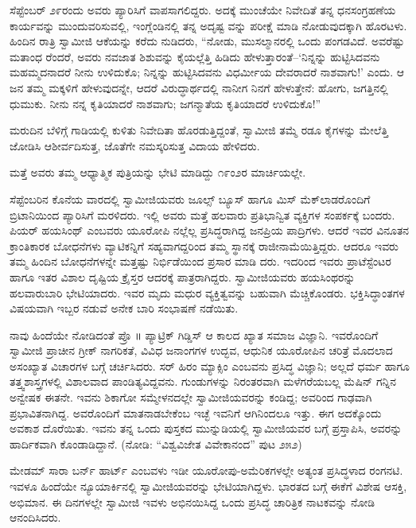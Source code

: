 ಸೆಪ್ಟೆಂಬರ್ ೨೯ರಂದು ಅವರು ಪ್ಯಾರಿಸಿಗೆ ವಾಪಸಾಗಲಿದ್ದರು. ಅದಕ್ಕೆ ಮುಂಚೆಯೇ ನಿವೇದಿತೆ ತನ್ನ ಧನಸಂಗ್ರಹಣೆಯ ಕಾರ್ಯವನ್ನು ಮುಂದುವರಿಸುವಲ್ಲಿ, ಇಂಗ್ಲೆಂಡಿನಲ್ಲಿ ತನ್ನ ಅದೃಷ್ಟ ವನ್ನು ಪರೀಕ್ಷೆ ಮಾಡಿ ನೋಡುವುದಕ್ಕಾಗಿ ಹೊರಟಳು. ಹಿಂದಿನ ರಾತ್ರಿ ಸ್ವಾಮೀಜಿ ಆಕೆಯನ್ನು ಕರೆದು ನುಡಿದರು, “ನೋಡು, ಮುಸಲ್ಮಾನರಲ್ಲಿ ಒಂದು ಪಂಗಡವಿದೆ. ಅವರೆಷ್ಟು ಮತಾಂಧ ರೆಂದರೆ, ಅವರು ನವಜಾತ ಶಿಶುವನ್ನು ಕೈಯಲ್ಲೆತ್ತಿ ಹಿಡಿದು ಹೇಳುತ್ತಾರಂತೆ–‘ನಿನ್ನನ್ನು ಹುಟ್ಟಿಸಿದವನು ಮಹಮ್ಮದನಾದರೆ ನೀನು ಉಳಿದುಕೊ; ನಿನ್ನನ್ನು ಹುಟ್ಟಿಸಿದವನು ವಿಧರ್ಮೀಯ ದೇವರಾದರೆ ನಾಶವಾಗು!’ ಎಂದು. ಆ ಜನ ತಮ್ಮ ಮಕ್ಕಳಿಗೆ ಹೇಳುವುದನ್ನೇ, ಆದರೆ ವಿರುದ್ಧಾರ್ಥದಲ್ಲಿ ನಾನೀಗ ನಿನಗೆ ಹೇಳುತ್ತೇನೆ: ಹೋಗು, ಜಗತ್ತಿನಲ್ಲಿ ಧುಮುಕು. ನೀನು ನನ್ನ ಕೃತಿಯಾದರೆ ನಾಶವಾಗು; ಜಗನ್ಮಾತೆಯ ಕೃತಿಯಾದರೆ ಉಳಿದುಕೊ!”

ಮರುದಿನ ಬೆಳಿಗ್ಗೆ ಗಾಡಿಯಲ್ಲಿ ಕುಳಿತು ನಿವೇದಿತಾ ಹೊರಡುತ್ತಿದ್ದಂತೆ, ಸ್ವಾಮೀಜಿ ತಮ್ಮೆ ರಡೂ ಕೈಗಳನ್ನು ಮೇಲೆತ್ತಿ ಜೋಡಿಸಿ ಆಶೀರ್ವದಿಸುತ್ತ, ಜೊತೆಗೇ ನಮಸ್ಕರಿಸುತ್ತ ವಿದಾಯ ಹೇಳಿದರು.

ಮತ್ತೆ ಅವರು ತಮ್ಮ ಆಧ್ಯಾತ್ಮಿಕ ಪುತ್ರಿಯನ್ನು ಭೇಟಿ ಮಾಡಿದ್ದು ೧೯ಂ೨ರ ಮಾರ್ಚಿಯಲ್ಲೇ.

ಸೆಪ್ಟೆಂಬರಿನ ಕೊನೆಯ ವಾರದಲ್ಲಿ ಸ್ವಾಮೀಜಿಯವರು ಜೂಲ್ಸ್ ಬ್ಯೂಸ್ ಹಾಗೂ ಮಿಸ್ ಮೆಕ್​ಲಾಡರೊಂದಿಗೆ ಬ್ರಿಟಾನಿಯಿಂದ ಪ್ಯಾರಿಸಿಗೆ ಮರಳಿದರು. ಇಲ್ಲಿ ಅವರು ಮತ್ತೆ ಹಲವಾರು ಪ್ರತಿಭಾನ್ವಿತ ವ್ಯಕ್ತಿಗಳ ಸಂಪರ್ಕಕ್ಕೆ ಬಂದರು. ಪಿಯರ್ ಹಯಸಿಂಥ್ ಎಂಬವರು ಯೂರೋಪಿ ನಲ್ಲೆಲ್ಲ ಪ್ರಸಿದ್ಧರಾಗಿದ್ದ ಜನಪ್ರಿಯ ಪಾದ್ರಿಗಳು. ಆದರೆ ಇವರ ವಿನೂತನ ಕ್ರಾಂತಿಕಾರಕ ಬೋಧನೆಗಳು ವ್ಯಾಟಿಕನ್ನಿಗೆ ಸಹ್ಯವಾಗದ್ದರಿಂದ ತಮ್ಮ ಸ್ಥಾನಕ್ಕೆ ರಾಜೀನಾಮೆಯಿತ್ತಿದ್ದರು. ಆದರೂ ಇವರು ತಮ್ಮ ಹಿಂದಿನ ಬೋಧನೆಗಳನ್ನೇ ಮತ್ತಷ್ಟು ನಿರ್ಭಿಡೆಯಿಂದ ಪ್ರಸಾರ ಮಾಡಿ ದರು. ಇದರಿಂದ ಇವರು ಪ್ರಾಟೆಸ್ಟೆಂಟರ ಹಾಗೂ ಇತರ ವಿಶಾಲ ದೃಷ್ಟಿಯ ಕ್ರೈಸ್ತರ ಆದರಕ್ಕೆ ಪಾತ್ರರಾಗಿದ್ದರು. ಸ್ವಾಮೀಜಿಯವರು ಹಯಸಿಂಥರನ್ನು ಹಲವಾರುಬಾರಿ ಭೇಟಿಯಾದರು. ಇವರ ಮೃದು ಮಧುರ ವ್ಯಕ್ತಿತ್ವವನ್ನು ಬಹುವಾಗಿ ಮೆಚ್ಚಿಕೊಂಡರು. ಭಕ್ತಿಸಿದ್ಧಾಂತಗಳ ವಿಷಯವಾಗಿ ಇಬ್ಬರ ನಡುವೆ ಅನೇಕ ಬಾರಿ ಸಂಭಾಷಣೆ ನಡೆಯಿತು.

ನಾವು ಹಿಂದೆಯೇ ನೋಡಿದಂತೆ ಪ್ರೊ ॥ ಪ್ಯಾಟ್ರಿಕ್ ಗಿಡ್ಡಿಸ್ ಆ ಕಾಲದ ಖ್ಯಾತ ಸಮಾಜ ವಿಜ್ಞಾನಿ. ಇವರೊಂದಿಗೆ ಸ್ವಾಮೀಜಿ ಪ್ರಾಚೀನ ಗ್ರೀಕ್ ನಾಗರಿಕತೆ, ವಿವಿಧ ಜನಾಂಗಗಳ ಉದ್ಭವ, ಆಧುನಿಕ ಯೂರೋಪಿನ ಚರಿತ್ರೆ ಮೊದಲಾದ ಅಸಂಖ್ಯಾತ ವಿಚಾರಗಳ ಬಗ್ಗೆ ಚರ್ಚಿಸಿದರು. ಸರ್ ಹಿರಂ ಮ್ಯಾಕ್ಸಿಂ ಎಂಬವನು ಪ್ರಸಿದ್ಧ ವಿಜ್ಞಾನಿ; ಅಲ್ಲದೆ ಧರ್ಮ ಹಾಗೂ ತತ್ತ್ವಶಾಸ್ತ್ರಗಳಲ್ಲಿ ವಿಶಾಲವಾದ ಪಾಂಡಿತ್ಯವಿದ್ದವನು. ಗುಂಡುಗಳನ್ನು ನಿರಂತರವಾಗಿ ಮಳೆಗರೆಯಬಲ್ಲ ಮೆಷಿನ್ ಗನ್ನಿನ ಅನ್ವೇಷಕ ಈತನೇ. ಇವನು ಶಿಕಾಗೋ ಸಮ್ಮೇಳನದಲ್ಲೇ ಸ್ವಾಮೀಜಿಯವರನ್ನು ಕಂಡಿದ್ದ; ಅವರಿಂದ ಗಾಢವಾಗಿ ಪ್ರಭಾವಿತನಾಗಿದ್ದ. ಅವರೊಂದಿಗೆ ಮಾತನಾಡಬೇಕೆಂಬ ಇಚ್ಛೆ ಇವನಿಗೆ ಆಗಿನಿಂದಲೂ ಇತ್ತು. ಈಗ ಅದಕ್ಕೊಂದು ಅವಕಾಶ ದೊರೆಯಿತು. ಇವನು ತನ್ನ ಒಂದು ಪುಸ್ತಕದ ಮುನ್ನುಡಿಯಲ್ಲಿ ಸ್ವಾಮೀಜಿಯವರ ಬಗ್ಗೆ ಪ್ರಸ್ತಾಪಿಸಿ, ಅವರನ್ನು ಹಾರ್ದಿಕವಾಗಿ ಕೊಂಡಾಡಿದ್ದಾನೆ. (ನೋಡಿ: “ವಿಶ್ವವಿಜೇತ ವಿವೇಕಾನಂದ” ಪುಟ ೨೫೨)

ಮೇಡಮ್ ಸಾರಾ ಬರ್ನ್ ಹಾರ್ಟ್ ಎಂಬವಳು ಇಡೀ ಯೂರೋಪು-ಅಮೆರಿಕಗಳಲ್ಲೇ ಅತ್ಯಂತ ಪ್ರಸಿದ್ಧಳಾದ ರಂಗನಟಿ. ಇವಳೂ ಹಿಂದೆಯೇ ನ್ಯೂಯಾರ್ಕಿನಲ್ಲಿ ಸ್ವಾಮೀಜಿಯವರನ್ನು ಭೇಟಿಯಾಗಿದ್ದಳು. ಭಾರತದ ಬಗ್ಗೆ ಈಕೆಗೆ ವಿಶೇಷ ಆಸಕ್ತಿ, ಅಭಿಮಾನ. ಈ ದಿನಗಳಲ್ಲೇ ಸ್ವಾಮೀಜಿ ಇವಳು ಅಭಿನಯಿಸಿದ್ದ ಒಂದು ಪ್ರಸಿದ್ಧ ಚಾರಿತ್ರಿಕ ನಾಟಕವನ್ನು ನೋಡಿ ಆನಂದಿಸಿದರು.

